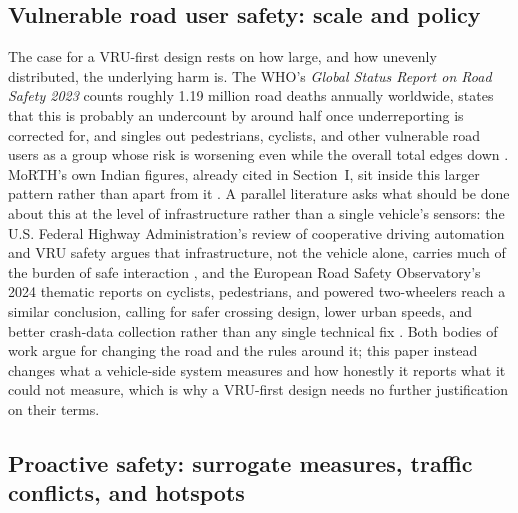 \documentclass[journal]{IEEEtran}
\begin{document}
\subsection{Vulnerable road user safety: scale and policy}

The case for a VRU-first design rests on how large, and how unevenly distributed, the underlying harm is. The WHO's \emph{Global Status Report on Road Safety 2023} counts roughly 1.19 million road deaths annually worldwide, states that this is probably an undercount by around half once underreporting is corrected for, and singles out pedestrians, cyclists, and other vulnerable road users as a group whose risk is worsening even while the overall total edges down \cite{who2023}. MoRTH's own Indian figures, already cited in Section~I, sit inside this larger pattern rather than apart from it \cite{morth}. A parallel literature asks what should be done about this at the level of infrastructure rather than a single vehicle's sensors: the U.S. Federal Highway Administration's review of cooperative driving automation and VRU safety argues that infrastructure, not the vehicle alone, carries much of the burden of safe interaction \cite{fhwa2022vru}, and the European Road Safety Observatory's 2024 thematic reports on cyclists, pedestrians, and powered two-wheelers reach a similar conclusion, calling for safer crossing design, lower urban speeds, and better crash-data collection rather than any single technical fix \cite{erso2024}. Both bodies of work argue for changing the road and the rules around it; this paper instead changes what a vehicle-side system measures and how honestly it reports what it could not measure, which is why a VRU-first design needs no further justification on their terms.

\subsection{Proactive safety: surrogate measures, traffic conflicts, and hotspots}
\end{document}
